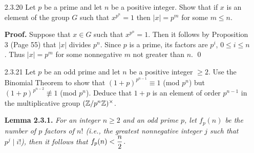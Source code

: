 \begin{enumerate}
      \textbf{Proof.} Let $H$ be a group and let $h \in H$. First we shall show
      that there exists a homomorphism from $\Z$ to $H$ such that $1 \mapsto h$.
      So consider the map $\alpha : \Z \rightarrow H$ defined by
      $n \mapsto h^n$. Clearly $\alpha(1) = h$ and
      $$\alpha(x+y) = h^{x+y} = h^xh^y = \alpha(x)\alpha(y) \text{ for all }
        x, y \in \Z^+,$$
      so that $\alpha$ is a homomorphism. To show uniqueness, suppose that
      $\alpha' : \Z \rightarrow H$ is an homomorphism such that
      $\alpha'(1) = h$. Then according to Exercise 1.6.1, we have that
      $\alpha'(n) = \alpha'(n\cdot1) = \alpha'(1)^n = h^n$ for all $n \in \Z$;
      that is, $\alpha' = \alpha$, as desired. \qed
   \item[2.3.20]  Let $p$ be a prime and let $n$ be a positive integer. Show
                  that if $x$ is an element of the group $G$ such that
                  $x^{p^n} = 1$ then $|x| = p^m$ for some $m \le n$.
                  
      \textbf{Proof.} Suppose that $x \in G$ such that $x^{p^n} = 1$. Then it
      follows by Proposition 3 (Page 55) that $|x|$ divides $p^n$. Since $p$ is
      a prime, its factors are $p^i$, $0 \le i \le n$. Thus $|x| = p^m$ for
      some nonnegative $m$ not greater than $n$. \qed
   \item[2.3.21]  Let $p$ be an odd prime and let $n$ be a positive integer
                  $\ge 2$. Use the Binomial Theorem to show that
                  $(1+p)^{p^{n-1}} \equiv 1$ (mod $p^n$) but
                  $(1+p)^{p^{n-2}} \not\equiv 1$ (mod $p^n$). Deduce that $1+p$
                  is an element of order $p^{n-1}$ in the multiplicative group
                  $(\mathbb{Z}/p^n\mathbb{Z})^\times$.

      \textbf{Lemma 2.3.1.} \textit{For an integer $n \ge 2$ and an odd prime
      $p$, let $f_p(n)$ be the number of $p$ factors of $n!$ (i.e., the greatest
      nonnegative integer $j$ such that $p^j \mid i!$), then it follows that
      $f_p(n) < \displaystyle\frac{n}{2}$}.


\end{enumerate}
